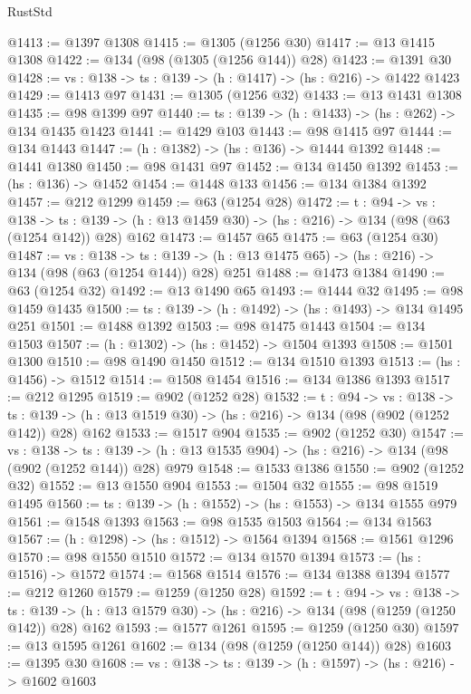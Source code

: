 \begin{lexlean}{RustStd}
\begin{coremodule}
{\begin{coremodule}
{{{{{{{{{@1413 := @1397 @1308
@1415 := @1305 (@1256 @30)
@1417 := @13 @1415 @1308
@1422 := @134 (@98 (@1305 (@1256 @144)) @28)
@1423 := @1391 @30
@1428 := {vs : @138} -> {ts : @139} -> (h : @1417) -> (hs : @216) -> @1422 @1423
@1429 := @1413 @97
@1431 := @1305 (@1256 @32)
@1433 := @13 @1431 @1308
@1435 := @98 @1399 @97
@1440 := {ts : @139} -> (h : @1433) -> (hs : @262) -> @134 @1435 @1423
@1441 := @1429 @103
@1443 := @98 @1415 @97
@1444 := @134 @1443
@1447 := (h : @1382) -> (hs : @136) -> @1444 @1392
@1448 := @1441 @1380
@1450 := @98 @1431 @97
@1452 := @134 @1450 @1392
@1453 := (hs : @136) -> @1452
@1454 := @1448 @133
@1456 := @134 @1384 @1392
@1457 := @212 @1299
@1459 := @63 (@1254 @28)
@1472 := {t : @94} ->
  {vs : @138} ->
  {ts : @139} -> (h : @13 @1459 @30) -> (hs : @216) -> @134 (@98 (@63 (@1254 @142)) @28) @162
@1473 := @1457 @65
@1475 := @63 (@1254 @30)
@1487 := {vs : @138} ->
  {ts : @139} -> (h : @13 @1475 @65) -> (hs : @216) -> @134 (@98 (@63 (@1254 @144)) @28) @251
@1488 := @1473 @1384
@1490 := @63 (@1254 @32)
@1492 := @13 @1490 @65
@1493 := @1444 @32
@1495 := @98 @1459 @1435
@1500 := {ts : @139} -> (h : @1492) -> (hs : @1493) -> @134 @1495 @251
@1501 := @1488 @1392
@1503 := @98 @1475 @1443
@1504 := @134 @1503
@1507 := (h : @1302) -> (hs : @1452) -> @1504 @1393
@1508 := @1501 @1300
@1510 := @98 @1490 @1450
@1512 := @134 @1510 @1393
@1513 := (hs : @1456) -> @1512
@1514 := @1508 @1454
@1516 := @134 @1386 @1393
@1517 := @212 @1295
@1519 := @902 (@1252 @28)
@1532 := {t : @94} ->
  {vs : @138} ->
  {ts : @139} -> (h : @13 @1519 @30) -> (hs : @216) -> @134 (@98 (@902 (@1252 @142)) @28) @162
@1533 := @1517 @904
@1535 := @902 (@1252 @30)
@1547 := {vs : @138} ->
  {ts : @139} -> (h : @13 @1535 @904) -> (hs : @216) -> @134 (@98 (@902 (@1252 @144)) @28) @979
@1548 := @1533 @1386
@1550 := @902 (@1252 @32)
@1552 := @13 @1550 @904
@1553 := @1504 @32
@1555 := @98 @1519 @1495
@1560 := {ts : @139} -> (h : @1552) -> (hs : @1553) -> @134 @1555 @979
@1561 := @1548 @1393
@1563 := @98 @1535 @1503
@1564 := @134 @1563
@1567 := (h : @1298) -> (hs : @1512) -> @1564 @1394
@1568 := @1561 @1296
@1570 := @98 @1550 @1510
@1572 := @134 @1570 @1394
@1573 := (hs : @1516) -> @1572
@1574 := @1568 @1514
@1576 := @134 @1388 @1394
@1577 := @212 @1260
@1579 := @1259 (@1250 @28)
@1592 := {t : @94} ->
  {vs : @138} ->
  {ts : @139} -> (h : @13 @1579 @30) -> (hs : @216) -> @134 (@98 (@1259 (@1250 @142)) @28) @162
@1593 := @1577 @1261
@1595 := @1259 (@1250 @30)
@1597 := @13 @1595 @1261
@1602 := @134 (@98 (@1259 (@1250 @144)) @28)
@1603 := @1395 @30
@1608 := {vs : @138} -> {ts : @139} -> (h : @1597) -> (hs : @216) -> @1602 @1603
}}}}}}}}}
\end{coremodule}}
\end{coremodule}
\end{lexlean}
